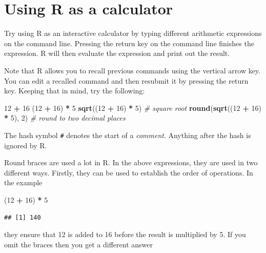 \documentclass[
]{book}
\newenvironment{Shaded}{\begin{snugshade}}{\end{snugshade}}
\newcommand{\CommentTok}[1]{\textcolor[rgb]{0.56,0.35,0.01}{\textit{#1}}}
\newcommand{\DecValTok}[1]{\textcolor[rgb]{0.00,0.00,0.81}{#1}}
\newcommand{\FunctionTok}[1]{\textcolor[rgb]{0.13,0.29,0.53}{\textbf{#1}}}
\newcommand{\NormalTok}[1]{#1}
\newcommand{\SpecialCharTok}[1]{\textcolor[rgb]{0.81,0.36,0.00}{\textbf{#1}}}
\begin{document}
\section{Using R as a calculator}\label{using-r-as-a-calculator}

Try using R as an interactive calculator by typing different
arithmetic expressions on the command line. Pressing the return key
on the command line finishes the expression. R will then evaluate the
expression and print out the result.

Note that R allows you to recall previous commands using the vertical
arrow key. You can edit a recalled command and then resubmit it by
pressing the return key. Keeping that in mind, try the following:

\begin{Shaded}
\begin{Highlighting}[]
\DecValTok{12} \SpecialCharTok{+} \DecValTok{16}
\NormalTok{(}\DecValTok{12} \SpecialCharTok{+} \DecValTok{16}\NormalTok{) }\SpecialCharTok{*} \DecValTok{5}
\FunctionTok{sqrt}\NormalTok{((}\DecValTok{12} \SpecialCharTok{+} \DecValTok{16}\NormalTok{) }\SpecialCharTok{*} \DecValTok{5}\NormalTok{) }\CommentTok{\# square root}
\FunctionTok{round}\NormalTok{(}\FunctionTok{sqrt}\NormalTok{((}\DecValTok{12} \SpecialCharTok{+} \DecValTok{16}\NormalTok{) }\SpecialCharTok{*} \DecValTok{5}\NormalTok{), }\DecValTok{2}\NormalTok{) }\CommentTok{\# round to two decimal places}
\end{Highlighting}
\end{Shaded}

The hash symbol \texttt{\#} denotes the start of a \emph{comment}.
Anything after the hash is ignored by R.

Round braces are used a lot in R. In the above expressions, they are
used in two different ways. Firstly, they can be used to establish the
order of operations. In the example

\begin{Shaded}
\begin{Highlighting}[]
\NormalTok{(}\DecValTok{12} \SpecialCharTok{+} \DecValTok{16}\NormalTok{) }\SpecialCharTok{*} \DecValTok{5}
\end{Highlighting}
\end{Shaded}

\begin{verbatim}
## [1] 140
\end{verbatim}

they ensure that 12 is added to 16 before the result is multiplied by 5.
If you omit the braces then you get a different answer
\end{document}
